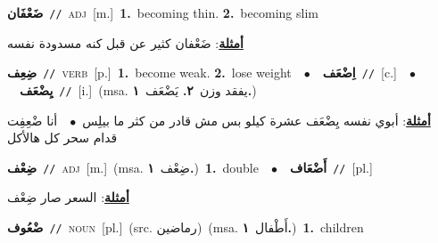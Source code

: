 \documentclass[10pt,a4paper,twoside]{article} %
\begin{document}
\begin{multicols}{2}
{\setlength\topsep{0pt}\textbf{\foreignlanguage{arabic}{ضَعْفَان}}\ {\color{gray}\texttt{//}\color{black}}\ \textsc{adj}\ [m.]\ \textbf{1.}~becoming thin.  \textbf{2.}~becoming slim\  \begin{flushright}\color{gray}\foreignlanguage{arabic}{\textbf{\underline{\foreignlanguage{arabic}{أمثلة}}}: ضَعْفان كثير عن قبل كنه مسدودة نفسه}\end{flushright}\color{black}} \vspace{2mm}

{\setlength\topsep{0pt}\textbf{\foreignlanguage{arabic}{ضِعِف}}\ {\color{gray}\texttt{//}\color{black}}\ \textsc{verb}\ [p.]\ \textbf{1.}~become weak.  \textbf{2.}~lose weight\ \ $\bullet$\ \ \setlength\topsep{0pt}\textbf{\foreignlanguage{arabic}{اِضْعَف}}\ {\color{gray}\texttt{//}\color{black}}\ [c.]\ \ $\bullet$\ \ \setlength\topsep{0pt}\textbf{\foreignlanguage{arabic}{يِضْعَف}}\ {\color{gray}\texttt{//}\color{black}}\ [i.]\ \color{gray}(msa. \foreignlanguage{arabic}{يفقد وزن}~\foreignlanguage{arabic}{\textbf{٢.}}  \foreignlanguage{arabic}{يَضْعَف}~\foreignlanguage{arabic}{\textbf{١.}})\color{black}\  \begin{flushright}\color{gray}\foreignlanguage{arabic}{\textbf{\underline{\foreignlanguage{arabic}{أمثلة}}}: أبوي نفسه يِضْعَف عشرة كيلو بس مش قادر من كثر ما بيلِس\ $\bullet$\ \  أنا ضْعِفِت قدام سحر كل هالأكل}\end{flushright}\color{black}} \vspace{2mm}

{\setlength\topsep{0pt}\textbf{\foreignlanguage{arabic}{ضِعْف}}\ {\color{gray}\texttt{//}\color{black}}\ \textsc{adj}\ [m.]\ \color{gray}(msa. \foreignlanguage{arabic}{ضِعْف}~\foreignlanguage{arabic}{\textbf{١.}})\color{black}\ \textbf{1.}~double\ \ $\bullet$\ \ \setlength\topsep{0pt}\textbf{\foreignlanguage{arabic}{أَضْعَاف}}\ {\color{gray}\texttt{//}\color{black}}\ [pl.]\  \begin{flushright}\color{gray}\foreignlanguage{arabic}{\textbf{\underline{\foreignlanguage{arabic}{أمثلة}}}: السعر صار ضِعْف}\end{flushright}\color{black}} \vspace{2mm}

{\setlength\topsep{0pt}\textbf{\foreignlanguage{arabic}{ضْعُوف}}\ {\color{gray}\texttt{//}\color{black}}\ \textsc{noun}\ [pl.]\ (src. \color{gray}\foreignlanguage{arabic}{رماضين}\color{black})\ \color{gray}(msa. \foreignlanguage{arabic}{أَطْفال}~\foreignlanguage{arabic}{\textbf{١.}})\color{black}\ \textbf{1.}~children\ } \vspace{2mm}


\end{multicols}
\end{document}
